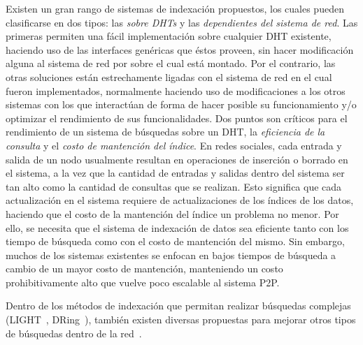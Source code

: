      Existen un gran rango de sistemas de indexación propuestos, los cuales pueden clasificarse en
    dos tipos: las \textit{sobre DHTs} y las \textit{dependientes del sistema de red}.
    Las primeras permiten una fácil implementación sobre cualquier DHT existente,
    haciendo uso de las interfaces genéricas que éstos proveen, sin hacer modificación
    alguna al sistema de red por sobre el cual está montado. Por el contrario, las
    otras soluciones están estrechamente ligadas con el sistema de red en el cual
    fueron implementados, normalmente haciendo uso de modificaciones a los otros
    sistemas con los que interactúan de forma de hacer posible su funcionamiento
    y/o optimizar el rendimiento de sus funcionalidades.
    Dos puntos son críticos para el rendimiento de un sistema de
    búsquedas sobre un DHT, la \textit{eficiencia de la consulta} y el
    \textit{costo de mantención del índice}. En redes sociales, cada entrada y
    salida de un nodo usualmente resultan en operaciones de inserción o borrado
    en el sistema, a la vez que la cantidad de entradas y salidas dentro del
    sistema ser tan alto como la cantidad de consultas que se realizan. Esto
    significa que cada actualización en el sistema requiere de actualizaciones de
    los índices de los datos, haciendo que el costo de la mantención del índice un
    problema no menor. Por ello, se necesita que el sistema de indexación de datos
    sea eficiente tanto con los tiempo de búsqueda como con el costo de mantención
    del mismo. Sin embargo, muchos de los sistemas existentes se enfocan en bajos
    tiempos de búsqueda a cambio de un mayor costo de mantención, manteniendo un costo prohibitivamente alto
    que vuelve poco escalable al sistema P2P.  %

    Dentro de los métodos de indexación que permitan realizar
    búsquedas complejas (LIGHT~\cite{journals_tkde_TangZX10},
    DRing~\cite{hidalgo2011dring}), también existen diversas propuestas para mejorar otros tipos de
    búsquedas dentro de la red~\cite{5345647, Ng02peerclustering, conf:infocom:SripanidkulchaiMZ03}.
    
    

